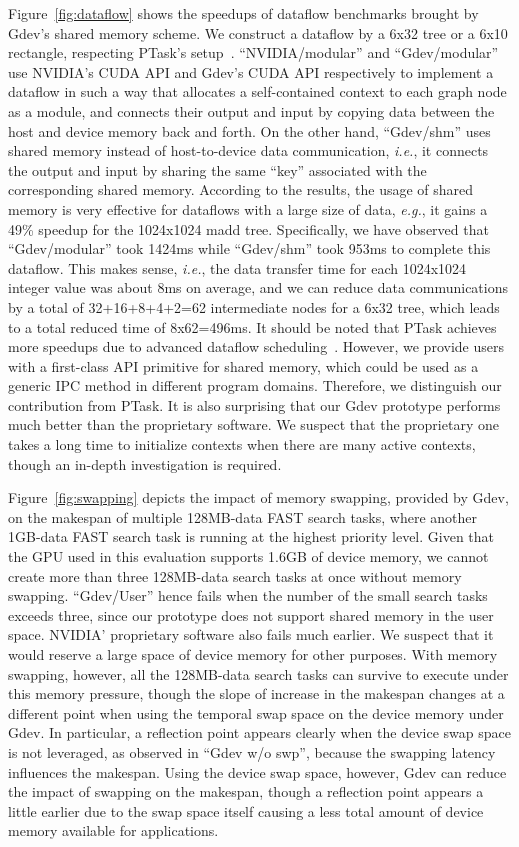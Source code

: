 Figure~\ref{fig:dataflow} shows the speedups of dataflow benchmarks
brought by Gdev's shared memory scheme.
We construct a dataflow by a 6x32 tree or a 6x10 rectangle, respecting
PTask's setup~\cite{Rossbach_SOSP11}.
``NVIDIA/modular'' and ``Gdev/modular'' use NVIDIA's CUDA API and Gdev's
CUDA API respectively to implement a dataflow in such a way that
allocates a self-contained context to each graph node as a module, and
connects their output and input by copying data between the host and
device memory back and forth.
On the other hand, ``Gdev/shm'' uses shared memory instead of
host-to-device data communication, \textit{i.e.}, it connects the output
and input by sharing the same ``key'' associated with the corresponding
shared memory.
According to the results, the usage of shared memory is very effective
for dataflows with a large size of data, \textit{e.g.}, it gains a 49\%
speedup for the 1024x1024 madd tree.
Specifically, we have observed that ``Gdev/modular'' took 1424ms while
``Gdev/shm'' took 953ms to complete this dataflow.
This makes sense, \textit{i.e.}, the data transfer time for each
1024x1024 integer value was about 8ms on average, and we can reduce data
communications by a total of 32+16+8+4+2=62 intermediate nodes for a
6x32 tree, which leads to a total reduced time of 8x62=496ms.
It should be noted that PTask achieves more speedups due to advanced
dataflow scheduling~\cite{Rossbach_SOSP11}.
However, we provide users with a first-class API primitive for shared
memory, which could be used as a generic IPC method in different program
domains.
Therefore, we distinguish our contribution from PTask.
It is also surprising that our Gdev prototype performs much better than
the proprietary software.
We suspect that the proprietary one takes a long time to initialize
contexts when there are many active contexts, though an in-depth
investigation is required.

Figure~\ref{fig:swapping} depicts the impact of memory swapping,
provided by Gdev, on the makespan of multiple 128MB-data FAST search
tasks, where another 1GB-data FAST search task is running at the highest
priority level.
Given that the GPU used in this evaluation supports
1.6GB of device memory, we cannot create more than three 128MB-data
search tasks at once without memory swapping.
``Gdev/User'' hence fails when the number of the small search tasks
exceeds three, since our prototype does not support shared memory in the
user space.
NVIDIA' proprietary software also fails much earlier.
We suspect that it would reserve a large space of device memory for
other purposes.
With memory swapping, however, all the 128MB-data search tasks can
survive to execute under this memory pressure, though the slope of
increase in the makespan changes at a different point when using the
temporal swap space on the device memory under Gdev.
In particular, a reflection point appears clearly when the device swap
space is not leveraged, as observed in ``Gdev w/o swp'', because the
swapping latency influences the makespan.
Using the device swap space, however, Gdev can reduce the impact of
swapping on the makespan, though a reflection point appears a little
earlier due to the swap space itself causing a less total amount of
device memory available for applications.

